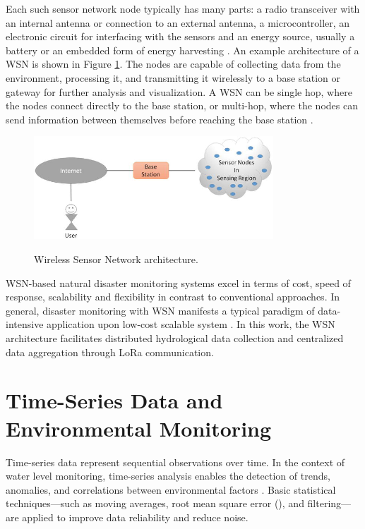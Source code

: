 Each such sensor network node typically has many parts: a radio transceiver with an internal antenna or connection to an external antenna, a microcontroller, an electronic circuit for interfacing with the sensors and an energy source, usually a battery or an embedded form of energy harvesting \cite{yellampalli_2021_wireless}. An example architecture of a WSN is shown in Figure \ref{fig:wsn-graphs}. The nodes are capable of collecting data from the environment, processing it, and transmitting it wirelessly to a base station or gateway for further analysis and visualization. A \gls{WSN} can be single hop, where the nodes connect directly to the base station, or multi-hop, where the nodes can send information between themselves before reaching the base station \cite{yellampalli_2021_wireless}.

\begin{figure}[h]
    \centering
    \caption{Wireless Sensor Network architecture.}
    \includegraphics[width=0.8\textwidth]{figuras/WSN_architecture.png}
    \label{fig:wsn-graphs}
\end{figure}

WSN-based natural disaster monitoring systems excel in terms of cost, speed of response, scalability and flexibility in contrast to conventional approaches. In general, disaster monitoring with WSN manifests a typical paradigm of data-intensive application upon low-cost scalable system \cite{chen_2013_natural, pule_2017_wireless, ferreira_2023_conception}. In this work, the \gls{WSN} architecture facilitates distributed hydrological data collection and centralized data aggregation through \gls{LoRa} communication.

\section{Time-Series Data and Environmental Monitoring}

Time-series data represent sequential observations over time. In the context of water level monitoring, time-series analysis enables the detection of trends, anomalies, and correlations between environmental factors \cite{lozano_2017_sensors}. Basic statistical techniques—such as moving averages, root mean square error (), and filtering—are applied to improve data reliability and reduce noise\cite{santana_2024_development}. 

